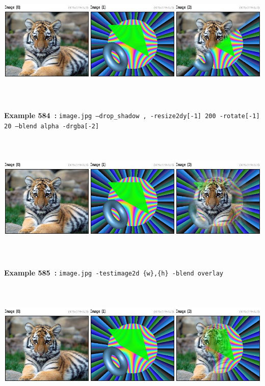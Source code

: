 \documentclass[a4paper,11pt,twoside]{book}
\begin{document}
\begin{center}\includegraphics[keepaspectratio=true,height=7cm,width=\textwidth]{img/gmic_def584.jpg}\\
{\footnotesize \textbf{Example 584~:} \texttt{image.jpg --drop\_shadow , -resize2dy[-1] 200 -rotate[-1] 20 --blend alpha -drgba[-2]}}
\\\includegraphics[keepaspectratio=true,height=7cm,width=\textwidth]{img/gmic_def585.jpg}\\
{\footnotesize \textbf{Example 585~:} \texttt{image.jpg -testimage2d \{w\},\{h\} -blend overlay}}
\\\includegraphics[keepaspectratio=true,height=7cm,width=\textwidth]{img/gmic_def586.jpg}\\

\end{center}
\end{document}
